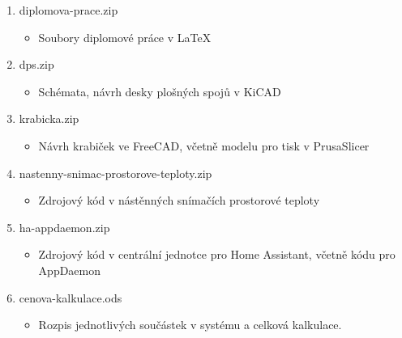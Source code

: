 \begin{enumerate}
  \item diplomova-prace.zip
  \begin{itemize}
     	\item Soubory diplomové práce v \LaTeX
  	\end{itemize}
  \item dps.zip 
  	\begin{itemize}
     	\item Schémata, návrh desky plošných spojů v KiCAD
  	\end{itemize}
  \item krabicka.zip
  	\begin{itemize}
     	\item Návrh krabiček ve FreeCAD, včetně modelu pro tisk v PrusaSlicer 
   	\end{itemize}
   \item nastenny-snimac-prostorove-teploty.zip
  		\begin{itemize}
     		\item Zdrojový kód v nástěnných snímačích prostorové teploty
   		\end{itemize}
   	\item ha-appdaemon.zip
  		\begin{itemize}
     		\item Zdrojový kód v centrální jednotce pro Home Assistant, včetně kódu pro AppDaemon
   		\end{itemize}
   	\item cenova-kalkulace.ods
  		\begin{itemize}
     		\item Rozpis jednotlivých součástek v systému a celková kalkulace.
   		\end{itemize}
\end{enumerate}